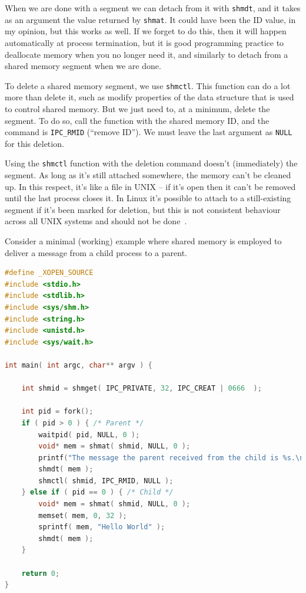 \documentclass[a4paper]{report}
\begin{document}
When we are done with a segment we can detach from it with \texttt{shmdt}, and it takes as an argument the value returned by \texttt{shmat}. It could have been the ID value, in my opinion, but this works as well. If we forget to do this, then it will happen automatically at process termination, but it is good programming practice to deallocate memory when you no longer need it, and similarly to detach from a shared memory segment when we are done.

To delete a shared memory segment, we use \texttt{shmctl}. This function can do a lot more than delete it, such as modify properties of the data structure that is used to control shared memory. But we just need to, at a minimum, delete the segment. To do so, call the function with the shared memory ID, and the command is \texttt{IPC\_RMID} (``remove ID''). We must leave the last argument as \texttt{NULL} for this deletion.

Using the \texttt{shmctl} function with the deletion command doesn't (immediately) the segment. As long as it's still attached somewhere, the memory can't be cleaned up. In this respect, it's like a file in UNIX -- if it's open then it can't be removed until the last process closes it. In Linux it's possible to attach to a still-existing segment if it's been marked for deletion, but this is not consistent behaviour across all UNIX systems and should not be done~\cite{lpi}.


Consider a minimal (working) example where shared memory is employed to deliver a message from a child process to a parent.
\begin{lstlisting}[language=C]
#define _XOPEN_SOURCE
#include <stdio.h>
#include <stdlib.h>
#include <sys/shm.h>
#include <string.h>
#include <unistd.h>
#include <sys/wait.h>

int main( int argc, char** argv ) { 

    int shmid = shmget( IPC_PRIVATE, 32, IPC_CREAT | 0666  );  

    int pid = fork();
    if ( pid > 0 ) { /* Parent */
        waitpid( pid, NULL, 0 );
        void* mem = shmat( shmid, NULL, 0 );
        printf("The message the parent received from the child is %s.\n", (char*) mem );
        shmdt( mem );
        shmctl( shmid, IPC_RMID, NULL );
    } else if ( pid == 0 ) { /* Child */
        void* mem = shmat( shmid, NULL, 0 );
        memset( mem, 0, 32 );
        sprintf( mem, "Hello World" );
        shmdt( mem );
    }   

    return 0;
}
\end{lstlisting}
\end{document}
